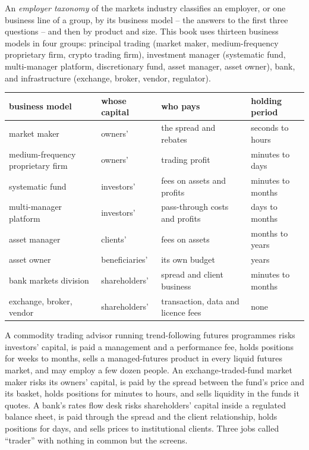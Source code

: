 \begin{definition}\label{def:in:a-map-of-the-industry:taxonomy}
An \emph{employer taxonomy} of the markets industry classifies an employer, or one business line of
a group, by its business model -- the answers to the first three questions -- and then by product and size. This book
uses thirteen business models in four groups: principal trading (market maker, medium-frequency proprietary firm, crypto
trading firm), investment manager (systematic fund, multi-manager platform, discretionary fund, asset manager, asset
owner), bank, and infrastructure (exchange, broker, vendor, regulator).
\end{definition}

\begin{center}\small
\begin{tabular}{@{}llp{4.2cm}l@{}}
\toprule
business model & whose capital & who pays & holding period\\
\midrule
market maker & owners' & the spread and rebates & seconds to hours\\
medium-frequency proprietary firm & owners' & trading profit & minutes to days\\
systematic fund & investors' & fees on assets and profits & minutes to months\\
multi-manager platform & investors' & pass-through costs and profits & days to months\\
asset manager & clients' & fees on assets & months to years\\
asset owner & beneficiaries' & its own budget & years\\
bank markets division & shareholders' & spread and client business & minutes to months\\
exchange, broker, vendor & shareholders' & transaction, data and licence fees & none\\
\bottomrule
\end{tabular}
\end{center}

\begin{example}\label{ex:in:a-map-of-the-industry:three}
A commodity trading advisor running trend-following futures programmes risks investors' capital, is paid a management
and a performance fee, holds positions for weeks to months, sells a managed-futures product in every liquid futures
market, and may employ a few dozen people. An exchange-traded-fund market maker risks its owners' capital, is paid by
the spread between the fund's price and its basket, holds positions for minutes to hours, and sells liquidity in the
funds it quotes. A bank's rates flow desk risks shareholders' capital inside a regulated balance sheet, is paid through
the spread and the client relationship, holds positions for days, and sells prices to institutional clients. Three
jobs called ``trader'' with nothing in common but the screens.
\end{example}


